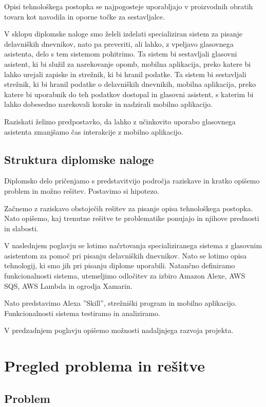 \documentclass[a4paper, 12pt]{book}
\begin{document}
Opisi tehnološkega postopka se najpogosteje uporabljajo v proizvodnih obratih tovarn kot navodila in oporne točke za sestavljalce.

V sklopu diplomske naloge smo želeli izdelati specializiran sistem za pisanje delavniških dnevnikov, nato pa preveriti, ali lahko, z vpeljavo glasovnega asistenta, delo s tem sistemom pohitrimo.
Ta sistem bi sestavljali glasovni asistent, ki bi služil za narekovanje opomb, mobilna aplikacija, preko katere bi lahko urejali zapiske in strežnik, ki bi hranil podatke.
Ta sistem bi sestavljali strežnik, ki bi hranil podatke o delavniških dnevnikih, mobilna aplikacija, preko katere bi uporabnik do teh podatkov dostopal in glasovni asistent, s katerim bi lahko dobesedno narekovali korake in nadzirali mobilno aplikacijo.

Raziskati želimo predpostavko, da lahko z učinkovito uporabo glasovnega asistenta zmanjšamo čas interakcije z mobilno aplikacijo.


\section{Struktura diplomske naloge}

Diplomsko delo pričenjamo s predstavitvijo področja raziskave in kratko opišemo problem in možno rešitev. 
Postavimo si hipotezo.

Začnemo z raziskavo obstoječih rešitev za pisanje opisa tehnološkega postopka.
Nato opišemo, kaj trenutne rešitve te problematike ponujajo in njihove prednosti in slabosti.

V naslednjem poglavju se lotimo načrtovanja specializiranega sistema z glasovnim asistentom za pomoč pri pisanju delavniških dnevnikov.
Nato se lotimo opisa tehnologij, ki smo jih pri pisanju diplome uporabili.
Natančno definiramo funkcionalnosti sistema, utemeljimo odločitev za izbiro Amazon Alexe, AWS SQS, AWS Lambda in ogrodja Xamarin.

Nato predstavimo Alexa ''Skill'', strežniški program in mobilno aplikacijo.
Funkcionalnosti sistema testiramo in analiziramo.

V predzadnjem poglavju opišemo možnosti nadaljnjega razvoja projekta.

\chapter{Pregled problema in rešitve}

\section{Problem}
\end{document}
